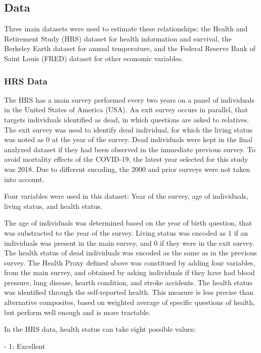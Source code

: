 \documentclass{article}
\begin{document}
\subsection{Data}

Three main datasets were used to estimate these relationships: 
the Health and Retirement Study (HRS) dataset for
health information and survival,
the Berkeley Earth dataset for annual temperature,
and the Federal Reserve Bank of Saint Louis (FRED) dataset for 
other economic variables.

\subsubsection{HRS Data}

The HRS has a main survey performed every two years on a panel of individuals in the United States of America (USA). 
An exit survey occurs in parallel, that targets individuals identified as dead, in which questions are asked to relatives.
The exit survey was used to identify dead individual, for which the living status was noted as $0$ at the year of the survey. 
Dead individuals were kept in the final analyzed dataset if they had been observed in the immediate previous survey. 
To avoid mortality effects of the COVID-19, the latest year selected for this study was 2018.
Due to different encoding, the 2000 and prior surveys were not taken into account. 

Four variables were used in this dataset: Year of the survey, age of individuals, living status, and health status.

The age of individuals was determined based on the year of birth question, that was substracted to the year of the survey. 
Living status was encoded as $1$ if an individuals was present in the main survey, and $0$ if they were in the exit survey.
The health status of dead individuals was encoded as the same as in the previous survey. 
The Health Proxy defined above was constitued by adding four variables,
from the main survey, and obtained by asking individuals if they have had blood pressure,
lung disease, hearth condition, and stroke accidents.
The health status was identified through the self-reported health.
This measure is less precise than alternative composites, based on weighted average of specific questions of health, 
but perform well enough and is more tractable.

In the HRS data, health status can take eight possible values: 


- 1: Excellent
\end{document}
